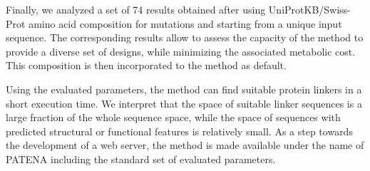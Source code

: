 Finally, we analyzed a set of 74 results obtained after using UniProtKB/Swiss-Prot amino acid composition for mutations and starting from a unique input sequence.
The corresponding results allow to assess the capacity of the method to provide a diverse set of designs, while minimizing the associated metabolic cost.
This composition is then incorporated to the method as default.

Using the evaluated parameters, the method can find suitable protein linkers in a short execution time. 
We interpret that the space of suitable linker sequences is a large fraction of the whole sequence space, 
while the space of sequences with predicted structural or functional features is relatively small.
As a step towards the development of a web server, the method is made available under the name of PATENA including the standard set of evaluated parameters.
